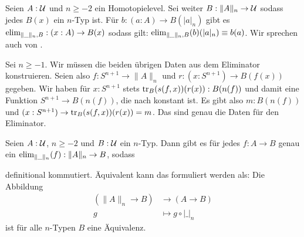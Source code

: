 \begin{lemma}
  \label{abschneidungsinduktion}
  Seien \(A:\mathcal{U}\) und \(n\geq -2\) ein Homotopielevel.
  Sei weiter \(B:\|A\|_n\to \mathcal{U}\) sodass jedes \(B(x)\) ein \(n\)-Typ ist.
  Für \(b:(a:A)\to B(|a|_n)\) gibt es \(\mathrm{elim}_{\|\_\|_n,B}:(x:A)\to B(x)\) sodass gilt:
  \(\mathrm{elim}_{\|\_\|_n,B}(b)(|a|_n)\equiv b(a)\).
  Wir sprechen auch von .
\end{lemma}

\begin{beweis}
  Sei \(n\geq -1\).
  Wir müssen die beiden übrigen Daten aus dem Eliminator konstruieren.
  Seien also \(f:S^{n+1}\to \|A\|_n\) und \(r:(x:S^{n+1})\to B(f(x))\) gegeben.
  Wir haben für \(x:S^{n+1}\) stets \(\mathrm{tr}_B(s(f,x))(r(x)):B(n(f))\) und damit eine
  Funktion \(S^{n+1}\to B(n(f))\), die nach  konstant ist.
  Es gibt also \(m:B(n(f))\) und \((x:S^{n+1})\to\mathrm{tr}_B(s(f,x))(r(x))=m \).
  Das sind genau die Daten für den Eliminator.
\end{beweis}

\begin{lemma}
  Seien \(A:\mathcal{U}\), \(n\geq -2\) und \(B:\mathcal{U}\) ein \(n\)-Typ.
  Dann gibt es für jedes \(f:A\to B\) genau ein \(\mathrm{elim}_{\|\_\|_n}(f):\|A\|_n\to B\),
  sodass
  \begin{center}
  \end{center}
  definitional kommutiert. Äquivalent kann das formuliert werden als:
  Die Abbildung
  \begin{align*}
    (\|A\|_n\to B) &\to (A\to B) \\
    g&\mapsto g\circ |\_|_n
  \end{align*}
  ist für alle \(n\)-Typen \(B\) eine Äquivalenz.
\end{lemma}

